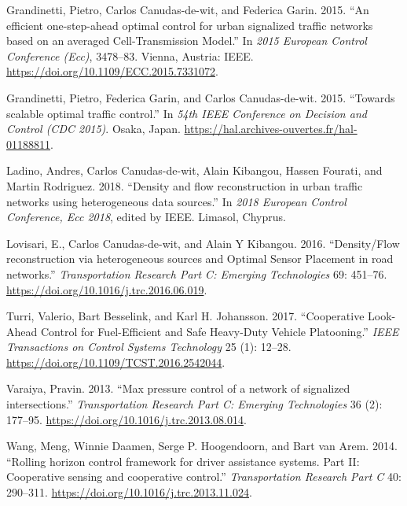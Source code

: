 \documentclass[]{book}
\theoremstyle{definition}
\theoremstyle{definition}
\theoremstyle{definition}
\theoremstyle{remark}
\begin{document}
\leavevmode\hypertarget{ref-Grandinetti2015}{}%
Grandinetti, Pietro, Carlos Canudas-de-wit, and Federica Garin. 2015.
``An efficient one-step-ahead optimal control for urban signalized
traffic networks based on an averaged Cell-Transmission Model.'' In
\emph{2015 European Control Conference (Ecc)}, 3478--83. Vienna,
Austria: IEEE. \url{https://doi.org/10.1109/ECC.2015.7331072}.

\leavevmode\hypertarget{ref-Grandinetti2016}{}%
Grandinetti, Pietro, Federica Garin, and Carlos Canudas-de-wit. 2015.
``Towards scalable optimal traffic control.'' In \emph{54th IEEE
Conference on Decision and Control (CDC 2015)}. Osaka, Japan.
\url{https://hal.archives-ouvertes.fr/hal-01188811}.

\leavevmode\hypertarget{ref-Ladino2018}{}%
Ladino, Andres, Carlos Canudas-de-wit, Alain Kibangou, Hassen Fourati,
and Martin Rodriguez. 2018. ``Density and flow reconstruction in urban
traffic networks using heterogeneous data sources.'' In \emph{2018
European Control Conference, Ecc 2018}, edited by IEEE. Limasol,
Chyprus.

\leavevmode\hypertarget{ref-Lovisari2016}{}%
Lovisari, E., Carlos Canudas-de-wit, and Alain Y Kibangou. 2016.
``Density/Flow reconstruction via heterogeneous sources and Optimal
Sensor Placement in road networks.'' \emph{Transportation Research Part
C: Emerging Technologies} 69: 451--76.
\url{https://doi.org/10.1016/j.trc.2016.06.019}.

\leavevmode\hypertarget{ref-Turri2017}{}%
Turri, Valerio, Bart Besselink, and Karl H. Johansson. 2017.
``Cooperative Look-Ahead Control for Fuel-Efficient and Safe Heavy-Duty
Vehicle Platooning.'' \emph{IEEE Transactions on Control Systems
Technology} 25 (1): 12--28.
\url{https://doi.org/10.1109/TCST.2016.2542044}.

\leavevmode\hypertarget{ref-Varaiya2013:TR-C}{}%
Varaiya, Pravin. 2013. ``Max pressure control of a network of signalized
intersections.'' \emph{Transportation Research Part C: Emerging
Technologies} 36 (2): 177--95.
\url{https://doi.org/10.1016/j.trc.2013.08.014}.

\leavevmode\hypertarget{ref-Meng2014b:TR-C}{}%
Wang, Meng, Winnie Daamen, Serge P. Hoogendoorn, and Bart van Arem.
2014. ``Rolling horizon control framework for driver assistance systems.
Part II: Cooperative sensing and cooperative control.''
\emph{Transportation Research Part C} 40: 290--311.
\url{https://doi.org/10.1016/j.trc.2013.11.024}.
\end{document}
